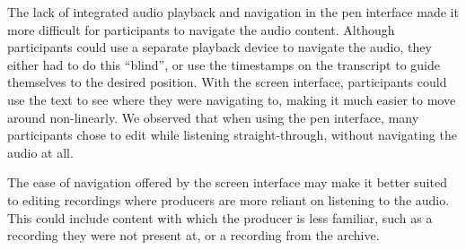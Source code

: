 



The lack of integrated audio playback and navigation in the pen interface made it more difficult for participants to
navigate the audio content.  Although participants could use a separate playback device to navigate the audio,
they either had to do this ``blind'', or use the timestamps on the transcript to guide themselves to the desired
position. With the screen interface, participants could use the text to see where they were navigating to, making it
much easier to move around non-linearly.  We observed that when using the pen interface, many participants chose to
edit while listening straight-through, without navigating the audio at all.

The ease of navigation offered by the screen interface may make it better suited to editing recordings where producers
are more reliant on listening to the audio. This could include content with which the producer is less familiar, such
as a recording they were not present at, or a recording from the archive.

